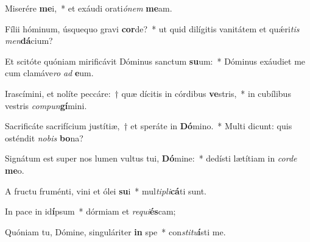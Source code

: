 \item Miserére \textbf{me}i,~* et exáudi orati\textit{ónem} \textbf{me}am.
\item Fílii hóminum, úsquequo gravi \textbf{cor}de?~* ut quid dilígitis vanitátem et quǽri\textit{tis} \textit{men}\textbf{dá}cium?
\item Et scitóte quóniam mirificávit Dóminus sanctum \textbf{su}um:~* Dóminus exáudiet me cum clamáve\textit{ro} \textit{ad} \textbf{e}um.
\item Irascímini, et nolíte peccáre:~† quæ dícitis in córdibus \textbf{ve}stris,~* in cubílibus vestris \textit{compun}\textbf{gí}mini.
\item Sacrificáte sacrifícium justítiæ,~† et speráte in \textbf{Dó}mino.~* Multi dicunt: quis osténdit \textit{nobis} \textbf{bo}na?
\item Signátum est super nos lumen vultus tui, \textbf{Dó}mine:~* dedísti lætítiam in \textit{corde} \textbf{me}o.
\item A fructu fruménti, vini et ólei \textbf{su}i~* mul\textit{tipli}\textbf{cá}ti sunt.
\item In pace in id\textbf{í}psum~* dórmiam et \textit{requi}\textbf{és}cam;
\item Quóniam tu, Dómine, singuláriter \textbf{in} spe~* con\textit{stitu}\textbf{í}sti me.
